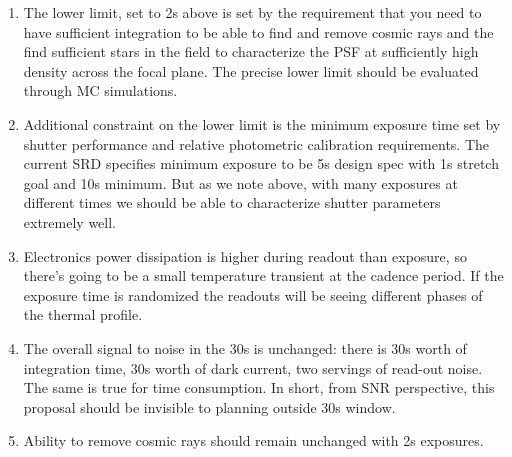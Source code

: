\documentclass[12pt, a4paper]{article}
\begin{document}
\begin{enumerate}


\item The lower limit, set to 2s above is set by the requirement that
  you need to have sufficient integration to be able to find and
  remove cosmic rays and the find sufficient stars in the field to
  characterize the PSF at sufficiently high density across the focal
  plane. The precise lower limit should be evaluated through MC
  simulations.

\item Additional constraint on the lower limit is the minimum exposure
  time set by shutter performance and relative photometric calibration
  requirements. The current SRD specifies minimum exposure to be 5s
  design spec with 1s stretch goal and 10s minimum. But as we note
  above, with many exposures at different times we should be able to
  characterize shutter parameters extremely well.

\item Electronics power dissipation is higher during readout than
  exposure, so there's going to be a small temperature transient at
  the cadence period. If the exposure time is randomized the readouts
  will be seeing different phases of the thermal profile.

\item The overall signal to noise in the 30s is unchanged: there is
  30s worth of integration time, 30s worth of dark current, two
  servings of read-out noise. The same is true for time
  consumption. In short, from SNR perspective, this proposal should be
  invisible to planning outside 30s window.

\item Ability to remove cosmic rays should remain unchanged with 2s exposures.
\end{enumerate}
\end{document}
